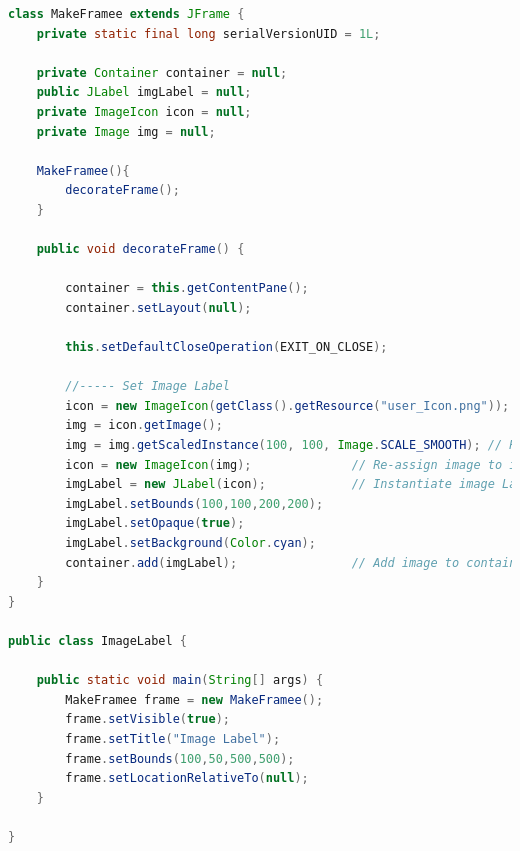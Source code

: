 \begin{frame}

\begin{lstlisting}[language=java]
class MakeFramee extends JFrame {
	private static final long serialVersionUID = 1L;
	
	private Container container = null;
	public JLabel imgLabel = null;
	private ImageIcon icon = null;
	private Image img = null;

	MakeFramee(){
		decorateFrame();
	}
	
	public void decorateFrame() {
		
		container = this.getContentPane();
		container.setLayout(null);
		
		this.setDefaultCloseOperation(EXIT_ON_CLOSE);

		//----- Set Image Label
		icon = new ImageIcon(getClass().getResource("user_Icon.png"));
		img = icon.getImage();
		img = img.getScaledInstance(100, 100, Image.SCALE_SMOOTH); // Resize Image
		icon = new ImageIcon(img);				// Re-assign image to icon
		imgLabel = new JLabel(icon);			// Instantiate image Label
		imgLabel.setBounds(100,100,200,200);
		imgLabel.setOpaque(true);
		imgLabel.setBackground(Color.cyan);
		container.add(imgLabel);				// Add image to container
	}
}

public class ImageLabel {

	public static void main(String[] args) {
		MakeFramee frame = new MakeFramee();
		frame.setVisible(true);
		frame.setTitle("Image Label");
		frame.setBounds(100,50,500,500);
		frame.setLocationRelativeTo(null);
	}

}
\end{lstlisting}


\end{frame}


